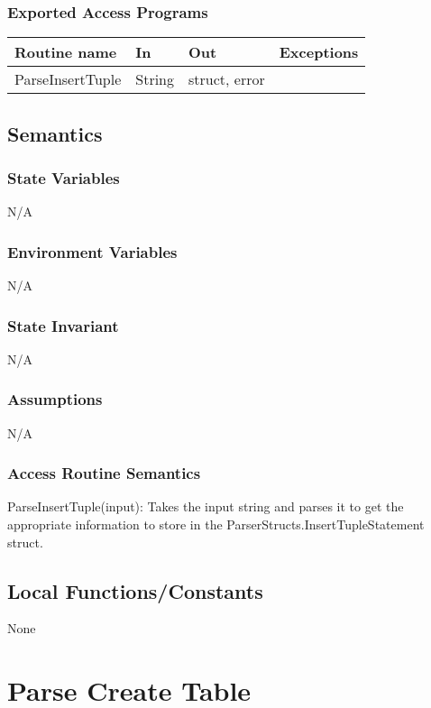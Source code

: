 \documentclass[12pt]{article}
\begin{document}
\subsubsection{Exported Access Programs}
\begin{tabular}{| l | l | l | l |}
\hline
\textbf{Routine name} & \textbf{In} & \textbf{Out} & \textbf{Exceptions}\\
\hline
{\color{red}ParseInsertTuple} & {\color{red}String} & {\color{red}struct, error} & \\
\hline
\end{tabular}

\subsection{Semantics}
\subsubsection{State Variables}
N/A

\subsubsection{Environment Variables}
N/A

\subsubsection{State Invariant}
N/A

\subsubsection{Assumptions}
N/A

\subsubsection{Access Routine Semantics}
{\color{red} \noindent ParseInsertTuple(input): Takes the input string and parses it to get the appropriate information to store in the ParserStructs.InsertTupleStatement struct.\\}

\subsection{Local Functions/Constants}
None

\newpage

\section{Parse Create Table}
\end{document}
